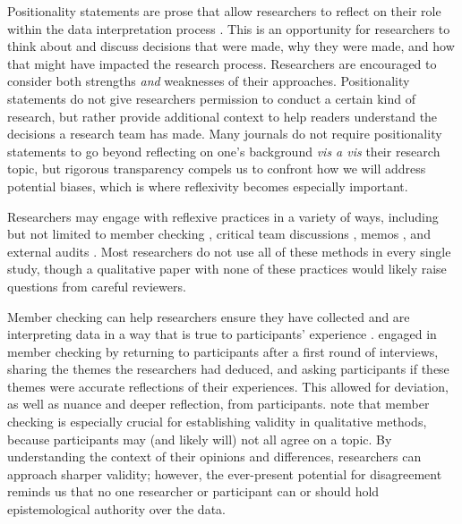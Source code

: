 \documentclass[authordate, meta, issue]{jote-new-article}
\begin{document}
Positionality statements are prose that allow researchers to reflect on their role within the data interpretation process \parencites{Clancy2013}{Guillemin2004}{Lazard2020}{Makel2022}{Patton2014}{Rooney2015}{Savin-Baden2013}. This is an opportunity for researchers to think about and discuss decisions that were made, why they were made, and how that might have impacted the research process. Researchers are encouraged to consider both strengths \emph{and }weaknesses of their approaches. Positionality statements do not give researchers permission to conduct a certain kind of research, but rather provide additional context to help readers understand the decisions a research team has made. Many journals do not require positionality statements to go beyond reflecting on one’s background \emph{vis a vis} their research topic, but rigorous transparency compels us to confront how we will address\emph{ }potential biases, which is where reflexivity becomes especially important.



Researchers may engage with reflexive practices in a variety of ways, including but not limited to member checking \parencites{Caretta2016}{Creswell2000}{Goldblatt2016}{Lincoln1986}{Stake1995}, critical team discussions \textcites{Mao2016}, memos \parencites{Birks2008}, and external audits \parencites{Wolf2003}. Most researchers do not use all of these methods in every single study, though a qualitative paper with none of these practices would likely raise questions from careful reviewers.



Member checking can help researchers ensure they have collected and are interpreting data in a way that is true to participants’ experience \parencites[e.g.,][]{Caretta2016}. \textcites{Bornstein2022} engaged in member checking by returning to participants after a first round of interviews, sharing the themes the researchers had deduced, and asking participants if these themes were accurate reflections of their experiences. This allowed for deviation, as well as nuance and deeper reflection, from participants. \textcite{Caretta2019} note that member checking is especially crucial for establishing validity in qualitative methods, because participants may (and likely will) not all agree on a topic. By understanding the context of their opinions and differences, researchers can approach sharper validity; however, the ever-present potential for disagreement reminds us that no one researcher or participant can or should hold epistemological authority over the data.
\end{document}
